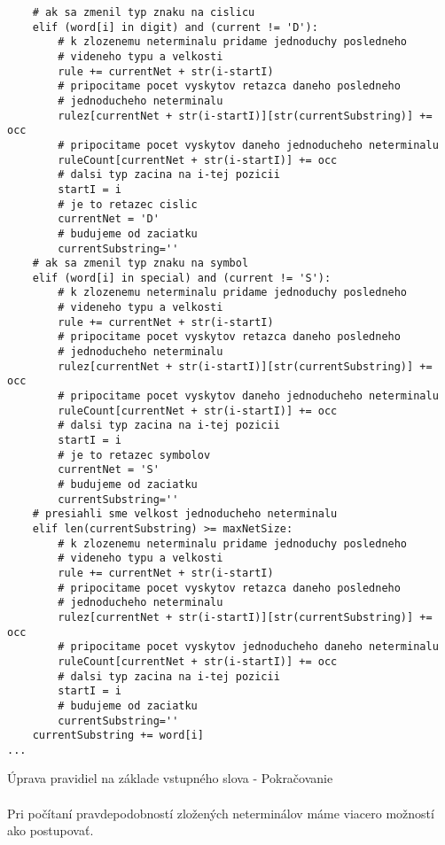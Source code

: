 \begin{listing}
\begin{verbatim}
	# ak sa zmenil typ znaku na cislicu
	elif (word[i] in digit) and (current != 'D'):
		# k zlozenemu neterminalu pridame jednoduchy posledneho
		# videneho typu a velkosti
		rule += currentNet + str(i-startI)
		# pripocitame pocet vyskytov retazca daneho posledneho
		# jednoducheho neterminalu
		rulez[currentNet + str(i-startI)][str(currentSubstring)] += occ
		# pripocitame pocet vyskytov daneho jednoducheho neterminalu
		ruleCount[currentNet + str(i-startI)] += occ
		# dalsi typ zacina na i-tej pozicii
		startI = i
		# je to retazec cislic
		currentNet = 'D'
		# budujeme od zaciatku
		currentSubstring=''
	# ak sa zmenil typ znaku na symbol
	elif (word[i] in special) and (current != 'S'):
		# k zlozenemu neterminalu pridame jednoduchy posledneho
		# videneho typu a velkosti
		rule += currentNet + str(i-startI)
		# pripocitame pocet vyskytov retazca daneho posledneho
		# jednoducheho neterminalu
		rulez[currentNet + str(i-startI)][str(currentSubstring)] += occ
		# pripocitame pocet vyskytov daneho jednoducheho neterminalu
		ruleCount[currentNet + str(i-startI)] += occ
		# dalsi typ zacina na i-tej pozicii
		startI = i
		# je to retazec symbolov
		currentNet = 'S'
		# budujeme od zaciatku
		currentSubstring=''
	# presiahli sme velkost jednoducheho neterminalu
	elif len(currentSubstring) >= maxNetSize:
		# k zlozenemu neterminalu pridame jednoduchy posledneho
		# videneho typu a velkosti
		rule += currentNet + str(i-startI)
		# pripocitame pocet vyskytov retazca daneho posledneho
		# jednoducheho neterminalu
		rulez[currentNet + str(i-startI)][str(currentSubstring)] += occ
		# pripocitame pocet vyskytov jednoducheho daneho neterminalu
		ruleCount[currentNet + str(i-startI)] += occ
		# dalsi typ zacina na i-tej pozicii
		startI = i
		# budujeme od zaciatku
		currentSubstring=''
	currentSubstring += word[i]
...
\end{verbatim}
\caption{Úprava pravidiel na základe vstupného slova - Pokračovanie}
\label{lst:grammar1-2}
\end{listing}

\paragraph{}
Pri počítaní pravdepodobností zložených neterminálov máme viacero možností ako postupovať.
